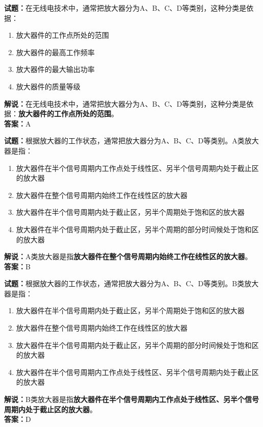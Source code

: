 \documentclass{ctexbook}
\begin{document}
\bigskip


\noindent\textbf{试题：}在无线电技术中，通常把放大器分为A、B、C、D等类别，这种分类是依据：
\begin{enumerate}[leftmargin=3em]
\item 放大器件的工作点所处的范围
\item 放大器件的最高工作频率
\item 放大器件的最大输出功率
\item 放大器件的质量等级
\end{enumerate}
\noindent\textbf{解说：}在无线电技术中，通常把放大器分为A、B、C、D等类别，这种分类是依据：\textbf{放大器件的工作点所处的范围}。\\\noindent\textbf{答案：}A



\bigskip


\noindent\textbf{试题：}根据放大器的工作状态，通常把放大器分为A、B、C、D等类别。A类放大器是指：
\begin{enumerate}[leftmargin=3em]
\item 放大器件在半个信号周期内工作点处于线性区、另半个信号周期内处于截止区的放大器
\item 放大器件在整个信号周期内始终工作在线性区的放大器
\item 放大器件在半个信号周期内处于截止区，另半个周期处于饱和区的放大器
\item 放大器件在半个信号周期内处于截止区，另半个周期的部分时间候处于饱和区的放大器
\end{enumerate}
\noindent\textbf{解说：}A类放大器是指\textbf{放大器件在整个信号周期内始终工作在线性区的放大器}。\\\noindent\textbf{答案：}B


\bigskip


\noindent\textbf{试题：}根据放大器的工作状态，通常把放大器分为A、B、C、D等类别。B类放大器是指：
\begin{enumerate}[leftmargin=3em]
\item 放大器件在半个信号周期内处于截止区，另半个周期处于饱和区的放大器
\item 放大器件在整个信号周期内始终工作在线性区的放大器
\item 放大器件在半个信号周期内处于截止区，另半个周期的部分时间候处于饱和区的放大器
\item 放大器件在半个信号周期内工作点处于线性区、另半个信号周期内处于截止区的放大器
\end{enumerate}
\noindent\textbf{解说：}B类放大器是指\textbf{放大器件在半个信号周期内工作点处于线性区、另半个信号周期内处于截止区的放大器}。\\\noindent\textbf{答案：}D
\end{document}
